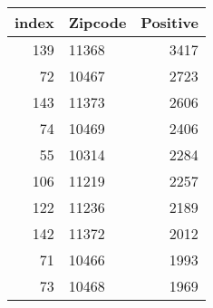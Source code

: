 \begin{tabular}{rlr}
\toprule
 index & Zipcode &  Positive \\
\midrule
   139 &   11368 &      3417 \\
    72 &   10467 &      2723 \\
   143 &   11373 &      2606 \\
    74 &   10469 &      2406 \\
    55 &   10314 &      2284 \\
   106 &   11219 &      2257 \\
   122 &   11236 &      2189 \\
   142 &   11372 &      2012 \\
    71 &   10466 &      1993 \\
    73 &   10468 &      1969 \\
\bottomrule
\end{tabular}
